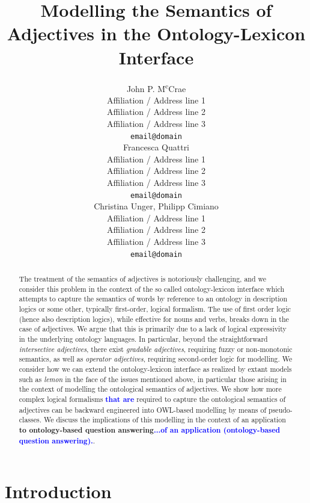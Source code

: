 \documentclass[11pt]{article}
\title{Modelling the Semantics of Adjectives in the Ontology-Lexicon Interface}
\author{John P. M\textsuperscript{c}Crae\\
  Affiliation / Address line 1 \\
  Affiliation / Address line 2 \\
  Affiliation / Address line 3 \\
  {\tt email@domain} \\\And
  Francesca Quattri \\
  Affiliation / Address line 1 \\
  Affiliation / Address line 2 \\
  Affiliation / Address line 3 \\
  {\tt email@domain} \\\And
  Christina Unger, Philipp Cimiano \\
  Affiliation / Address line 1 \\
  Affiliation / Address line 2 \\
  Affiliation / Address line 3 \\
{\tt email@domain}}
\date{}
\begin{document}
\maketitle
\begin{abstract}
The treatment of the semantics of adjectives is notoriously challenging, and we consider this problem in the context of the so called ontology-lexicon interface which attempts to capture the semantics of words by reference to an ontology in description logics or some other, typically first-order, logical formalism.
The use of first order logic (hence also description logics),
while effective for nouns and verbs, breaks down in the case of adjectives. 
We argue that this is primarily due to a lack of logical expressivity in the 
underlying ontology languages. In particular, beyond the straightforward \emph{intersective adjectives}, there exist \emph{gradable adjectives}, requiring fuzzy or
non-monotonic semantics, as well as \emph{operator adjectives}, requiring second-order logic for modelling. 
We consider how we can extend the ontology-lexicon interface as realized by extant models such as \emph{lemon} in the face of the issues mentioned above, in particular those arising in the context of modelling the ontological semantics of adjectives. We show how more complex logical formalisms \textbf{\textcolor{blue}{that are}} required to capture the ontological semantics of adjectives can be backward 
engineered into OWL-based modelling by means of pseudo-classes. We discuss the implications of this modelling in the context of an application \textbf{to ontology-based question answering\textcolor{blue}{...of an application (ontology-based question answering).}}.
\end{abstract}



\section{Introduction}
\label{intro}
\end{document}
